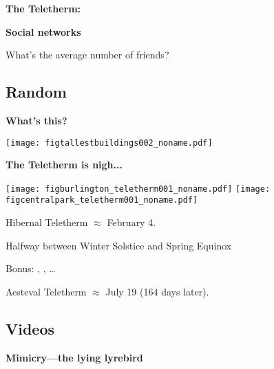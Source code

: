   \cite{hill2008a}



  \textbf{The Teletherm:}
  




  \textbf{Social networks}

  What's the average number of friends?



\subsection{Random}


  \textbf{What's this?}
  
  \texttt{[image: figtallestbuildings002\_noname.pdf]}




  \textbf{The Teletherm is nigh...}
    \begin{center}
    \texttt{[image: figburlington\_teletherm001\_noname.pdf]}
    \texttt{[image: figcentralpark\_teletherm001\_noname.pdf]}
    \end{center}
    
     
      Hibernal Teletherm $\approx$ February 4.
     
      Halfway between Winter Solstice and Spring Equinox
     
      Bonus: , 
      , \ldots
     
      Aesteval Teletherm $\approx$ July 19 (164 days later).
    
  



\subsection{Videos}

  \textbf{Mimicry---the lying lyrebird}



